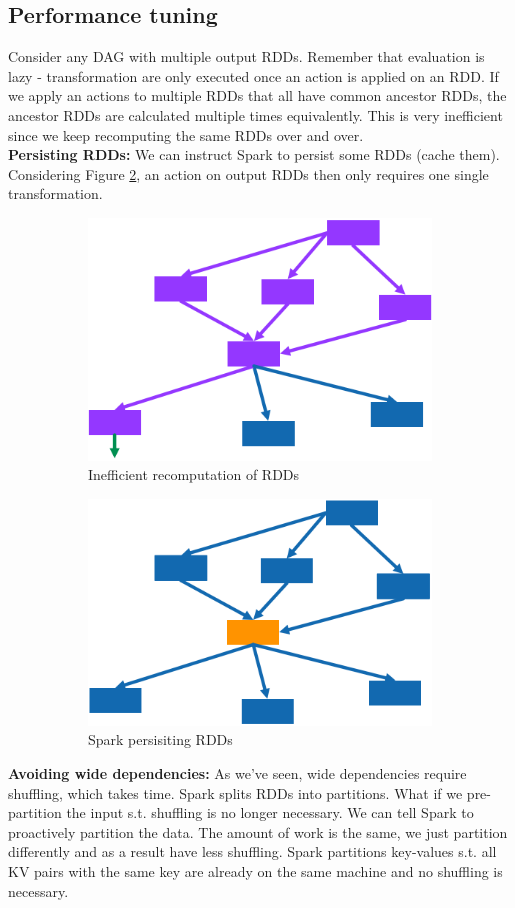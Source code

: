 \documentclass[11pt,oneside,a4paper]{article}
\begin{document}
\subsection{Performance tuning}

Consider any DAG with multiple output RDDs. Remember that evaluation is lazy - transformation are only executed once an action is applied on an RDD. If we apply an actions to multiple RDDs that all have common ancestor RDDs, the ancestor RDDs are calculated multiple times equivalently. This is very inefficient since we keep recomputing the same RDDs over and over.\\

\textbf{Persisting RDDs:} We can instruct Spark to persist some RDDs (cache them). Considering Figure \ref{fig:sparkpersrdds}, an action on output RDDs then only requires one single transformation.

\begin{figure}[t!]
	\centering
	\begin{subfigure}[t]{.5\textwidth}
		\centering
		\includegraphics[width=0.25\linewidth]{figures/spark_dag_ineff}
		\caption{Inefficient recomputation of RDDs}
	\end{subfigure}%
	\begin{subfigure}[t]{.5\textwidth}
		\centering
		\includegraphics[width=0.25\linewidth]{figures/spark_persisting_rdds}
		\caption{Spark persisiting RDDs}
		\label{fig:sparkpersrdds}
	\end{subfigure}
	\caption{}
\end{figure}

\textbf{Avoiding wide dependencies:} As we've seen, wide dependencies require shuffling, which takes time. Spark splits RDDs into partitions. What if we pre-partition the input s.t. shuffling is no longer necessary. We can tell Spark to proactively partition the data. The amount of work is the same, we just partition differently and as a result have less shuffling. Spark partitions key-values s.t. all KV pairs with the same key are already on the same machine and no shuffling is necessary.
\end{document}
